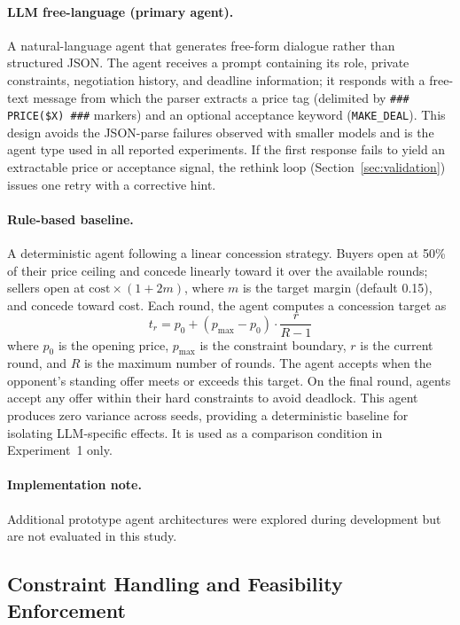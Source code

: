 \paragraph{LLM free-language (primary agent).}
A natural-language agent that generates free-form dialogue rather than structured JSON.  The agent receives a prompt containing its role, private constraints, negotiation history, and deadline information; it responds with a free-text message from which the parser extracts a price tag (delimited by \texttt{\#\#\# PRICE(\$X) \#\#\#} markers) and an optional acceptance keyword (\texttt{MAKE\_DEAL}).  This design avoids the JSON-parse failures observed with smaller models and is the agent type used in all reported experiments.  If the first response fails to yield an extractable price or acceptance signal, the rethink loop (Section~\ref{sec:validation}) issues one retry with a corrective hint.

\paragraph{Rule-based baseline.}
A deterministic agent following a linear concession strategy.  Buyers open at 50\% of their price ceiling and concede linearly toward it over the available rounds; sellers open at $\text{cost} \times (1 + 2m)$, where $m$ is the target margin (default 0.15), and concede toward cost.  Each round, the agent computes a concession target as
\[
    t_r = p_0 + (p_{\max} - p_0) \cdot \frac{r}{R - 1}
\]
where $p_0$ is the opening price, $p_{\max}$ is the constraint boundary, $r$ is the current round, and $R$ is the maximum number of rounds.  The agent accepts when the opponent's standing offer meets or exceeds this target.  On the final round, agents accept any offer within their hard constraints to avoid deadlock.  This agent produces zero variance across seeds, providing a deterministic baseline for isolating LLM-specific effects.  It is used as a comparison condition in Experiment~1 only.

\paragraph{Implementation note.}
Additional prototype agent architectures were explored during development but are not evaluated in this study.

\subsection{Constraint Handling and Feasibility Enforcement}
\label{sec:enforcement}

